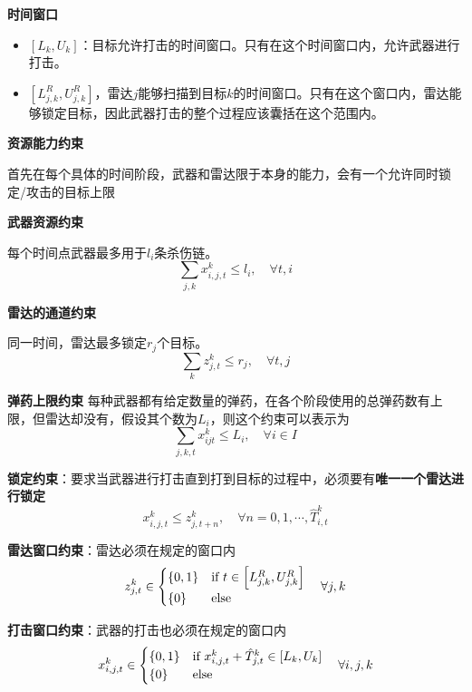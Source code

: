 \textbf{时间窗口}
\begin{itemize}
    \item $[L_{k}, U_k]$：目标允许打击的时间窗口。只有在这个时间窗口内，允许武器进行打击。
    \item $[L_{j, k}^R, U_{j,k}^R]$，雷达$j$能够扫描到目标$k$的时间窗口。只有在这个窗口内，雷达能够锁定目标，因此武器打击的整个过程应该囊括在这个范围内。
\end{itemize}


\textbf{资源能力约束}

首先在每个具体的时间阶段，武器和雷达限于本身的能力，会有一个允许同时锁定/攻击的目标上限

\textbf{武器资源约束}

每个时间点武器最多用于$l_i$条杀伤链。
\begin{equation*}
    \sum_{j, k} x_{i,j,t}^k \leq l_i, \quad \forall t, i 
\end{equation*}

\textbf{雷达的通道约束}

同一时间，雷达最多锁定$r_j$个目标。
\begin{equation*}
    \sum_{k} z_{j,t}^k \leq r_j, \quad \forall t,j
\end{equation*}

\textbf{弹药上限约束}
每种武器都有给定数量的弹药，在各个阶段使用的总弹药数有上限，但雷达却没有，假设其个数为$L_i$，则这个约束可以表示为
\begin{equation*}
    \sum_{j,k,t} x_{ijt}^k \leq L_i, \quad \forall i \in I
\end{equation*}


\textbf{锁定约束}：要求当武器进行打击直到打到目标的过程中，必须要有\textbf{唯一一个雷达进行锁定}
\begin{equation*}
    x_{i,j,t}^k \leq z_{j, t+n}^k, \quad \forall n = 0, 1, \cdots, \hat{T}_{i,t}^k 
\end{equation*}

\textbf{雷达窗口约束}：雷达必须在规定的窗口内
\begin{equation*}
    z_{j, t}^k \in \begin{cases} 
        \{0,1\} & \text{if } t \in \left[ L_{j,k}^R, U_{j,k}^R \right]  \\
        \{0\} & \text{else}  
        \end{cases}\quad \forall j, k
\end{equation*}

\textbf{打击窗口约束}：武器的打击也必须在规定的窗口内
\begin{equation*}
    x_{i,j, t}^k \in \begin{cases} 
        \{0,1\} & \text{if } x_{i,j,t}^k + \hat{T}_{j,t}^k \in \left[ L_{k}, U_{k} \right]  \\
        \{0\} & \text{else}  
        \end{cases}\quad \forall i, j, k
\end{equation*}


